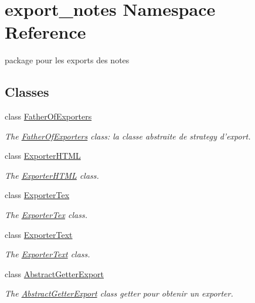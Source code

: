 \hypertarget{namespaceexport__notes}{\section{export\-\_\-notes Namespace Reference}
\label{namespaceexport__notes}
}


package pour les exports des notes  


\subsection*{Classes}
\begin{DoxyCompactItemize}
\item 
class \hyperlink{classexport__notes_1_1_father_of_exporters}{Father\-Of\-Exporters}
\begin{DoxyCompactList}\small\item\em The \hyperlink{classexport__notes_1_1_father_of_exporters}{Father\-Of\-Exporters} class\-: la classe abstraite de strategy d'export. \end{DoxyCompactList}\item 
class \hyperlink{classexport__notes_1_1_exporter_h_t_m_l}{Exporter\-H\-T\-M\-L}
\begin{DoxyCompactList}\small\item\em The \hyperlink{classexport__notes_1_1_exporter_h_t_m_l}{Exporter\-H\-T\-M\-L} class. \end{DoxyCompactList}\item 
class \hyperlink{classexport__notes_1_1_exporter_tex}{Exporter\-Tex}
\begin{DoxyCompactList}\small\item\em The \hyperlink{classexport__notes_1_1_exporter_tex}{Exporter\-Tex} class. \end{DoxyCompactList}\item 
class \hyperlink{classexport__notes_1_1_exporter_text}{Exporter\-Text}
\begin{DoxyCompactList}\small\item\em The \hyperlink{classexport__notes_1_1_exporter_text}{Exporter\-Text} class. \end{DoxyCompactList}\item 
class \hyperlink{classexport__notes_1_1_abstract_getter_export}{Abstract\-Getter\-Export}
\begin{DoxyCompactList}\small\item\em The \hyperlink{classexport__notes_1_1_abstract_getter_export}{Abstract\-Getter\-Export} class getter pour obtenir un exporter. \end{DoxyCompactList}\item 

\end{DoxyCompactItemize}
